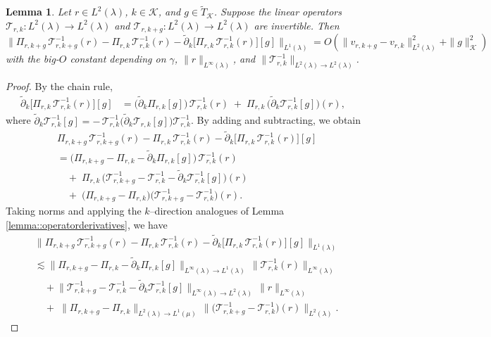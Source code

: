 \documentclass[11pt]{article}
\newcommand{\addTK}{\widetilde T_{\mathcal K}}
\newcommand{\adk}{\widetilde{\partial}_k}
\theoremstyle{plain}
\newtheorem{lemma}[theorem]{Lemma}
\begin{document}
 


\begin{lemma}
\label{lemma::valuestarderivativekernel}
Let $r \in L^2(\lambda)$, $k \in \mathcal{K}$, and $g \in \addTK$. 
Suppose the linear operators $\mathcal{T}_{r,k}:L^2(\lambda) \to L^2(\lambda)$ 
and $\mathcal{T}_{r,k+g}:L^2(\lambda) \to L^2(\lambda)$ are invertible. Then
\[
\big\|\Pi_{r,k+g}\,\mathcal{T}_{r,k+g}^{-1}(r) 
- \Pi_{r,k}\,\mathcal{T}_{r,k}^{-1}(r) 
- \adk\!\big[\Pi_{r,k}\,\mathcal{T}_{r,k}^{-1}(r)\big][g]\big\|_{L^1(\lambda)} 
= O\!\left(\|v_{r,k+g} - v_{r,k}\|_{L^2(\lambda)}^{2} + \|g\|_{\mathcal K}^{2}\right)
\]
with the big-$O$ constant depending on $\gamma$, $\|r\|_{L^\infty(\lambda)}$, 
and $\|\mathcal{T}_{r,k}^{-1}\|_{L^2(\lambda)\to L^2(\lambda)}$.
\end{lemma}


\begin{proof}
By the chain rule,
\begin{align*}
\adk\!\big[\Pi_{r,k}\,\mathcal{T}_{r,k}^{-1}(r)\big][g]
&= \big(\adk \Pi_{r,k}[g]\big)\,\mathcal{T}_{r,k}^{-1}(r)
\;+\;\Pi_{r,k}\,\big(\adk \mathcal{T}_{r,k}^{-1}[g]\big)(r),
\end{align*}
where $\adk \mathcal{T}_{r,k}^{-1}[g] = -\,\mathcal{T}_{r,k}^{-1}\big(\adk \mathcal{T}_{r,k}[g]\big)\mathcal{T}_{r,k}^{-1}$.
By adding and subtracting, we obtain
\begin{align*}
&\Pi_{r,k+g}\,\mathcal{T}_{r,k+g}^{-1}(r) - \Pi_{r,k}\,\mathcal{T}_{r,k}^{-1}(r) - \adk\!\big[\Pi_{r,k}\,\mathcal{T}_{r,k}^{-1}(r)\big][g] \\
&= \big(\Pi_{r,k+g}-\Pi_{r,k}-\adk \Pi_{r,k}[g]\big)\,\mathcal{T}_{r,k}^{-1}(r) \\
&\quad+\;\Pi_{r,k}\,\big(\mathcal{T}_{r,k+g}^{-1}-\mathcal{T}_{r,k}^{-1}-\adk \mathcal{T}_{r,k}^{-1}[g]\big)(r) \\
&\quad+\;\big(\Pi_{r,k+g}-\Pi_{r,k}\big)\big(\mathcal{T}_{r,k+g}^{-1}-\mathcal{T}_{r,k}^{-1}\big)(r).
\end{align*}
Taking norms and applying the $k$–direction analogues of Lemma \ref{lemma::operatorderivatives}, we have
\begin{align*}
& \big\|\Pi_{r,k+g}\,\mathcal{T}_{r,k+g}^{-1}(r) - \Pi_{r,k}\,\mathcal{T}_{r,k}^{-1}(r) - \adk\!\big[\Pi_{r,k}\,\mathcal{T}_{r,k}^{-1}(r)\big][g]\big\|_{L^1(\lambda)} \\
&\lesssim \big\|\Pi_{r,k+g}-\Pi_{r,k}-\adk \Pi_{r,k}[g]\big\|_{L^\infty(\lambda) \to L^1(\lambda)} \,\big\|\mathcal{T}_{r,k}^{-1}(r)\big\|_{L^\infty(\lambda)} \\
&\quad+ \big\|\mathcal{T}_{r,k+g}^{-1}-\mathcal{T}_{r,k}^{-1}-\adk \mathcal{T}_{r,k}^{-1}[g]\big\|_{L^\infty(\lambda) \to L^2(\lambda)} \,\|r\|_{L^\infty(\lambda)} \\
&\quad+\;\big\|\Pi_{r,k+g}-\Pi_{r,k}\big\|_{L^2(\lambda) \to L^1(\mu)}\,\big\|\big(\mathcal{T}_{r,k+g}^{-1}-\mathcal{T}_{r,k}^{-1}\big)(r)\big\|_{L^2(\lambda)}.
\end{align*}




\end{proof}
\end{document}

